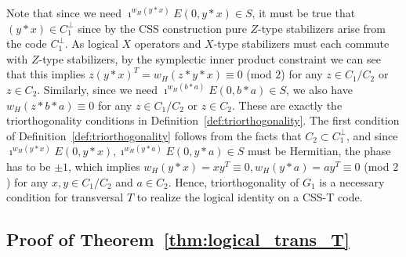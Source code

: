 \documentclass[twoside,romanappendices]{IEEEtran}
\begin{document}
Note that since we need $\imath^{w_H(y \ast x)} E(0, y \ast x) \in S$, it must be true that $(y \ast x) \in C_1^{\perp}$ since by the CSS construction pure $Z$-type stabilizers arise from the code $C_1^{\perp}$.
As logical $X$ operators and $X$-type stabilizers must each commute with $Z$-type stabilizers, by the symplectic inner product constraint we can see that this implies $z (y \ast x)^T = w_H(z \ast y \ast x) \equiv 0$ (mod $2$) for any $z \in C_1/C_2$ or $z \in C_2$.
Similarly, since we need $\imath^{w_H(b \ast a)} E(0, b \ast a) \in S$, we also have $w_H(z \ast b \ast a) \equiv 0$ for any $z \in C_1/C_2$ or $z \in C_2$.
These are exactly the triorthogonality conditions in Definition~\ref{def:triorthogonality}.
The first condition of Definition~\ref{def:triorthogonality} follows from the facts that $C_2 \subset C_1^{\perp}$, and since $\imath^{w_H(y \ast x)} E(0, y \ast x), \imath^{w_H(y \ast a)} E(0, y \ast a) \in S$ must be Hermitian, the phase has to be $\pm 1$, which implies $w_H(y \ast x) = xy^T \equiv 0, w_H(y \ast a) = ay^T \equiv 0$ (mod $2$) for any $x,y \in C_1/C_2$ and $a \in C_2$.
Hence, triorthogonality of $G_1$ is a necessary condition for transversal $T$ to realize the logical identity on a CSS-T code. \hfill \IEEEQEDhere



\subsection{Proof of Theorem~\ref{thm:logical_trans_T}}
\label{sec:proof_logical_trans_T}
\end{document}
